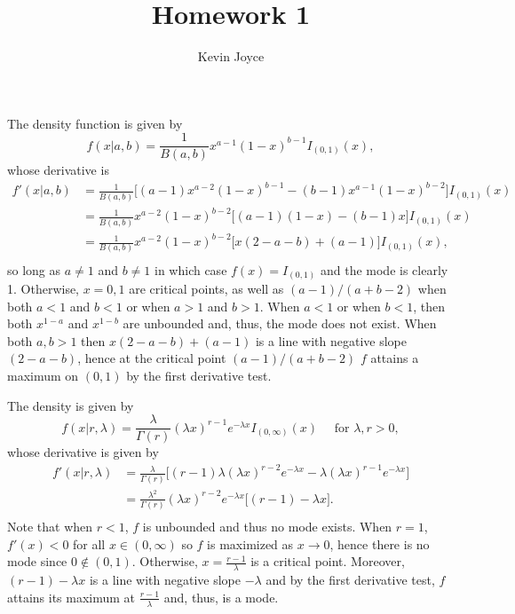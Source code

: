 \documentclass{homework}
\title{Homework 1}
\author{Kevin Joyce}
\begin{document}

  \begin{solution}
  The density function is given by 
  $$
    f(x|a,b) = \frac{1}{B(a,b)} x^{a-1}(1-x)^{b-1}I_{(0,1)}(x),
  $$
  whose derivative is 
  \begin{align*}
    f'(x|a,b) &= \frac{1}{B(a,b)} \Big[ (a-1)x^{a-2}(1-x)^{b-1} - (b-1)x^{a-1}(1-x)^{b-2}\Big]I_{(0,1)}(x) \\
	      &= \frac{1}{B(a,b)} x^{a-2}(1-x)^{b-2} \big[ (a-1)(1-x) - (b-1)x \big]I_{(0,1)}(x) \\
	      &= \frac{1}{B(a,b)} x^{a-2}(1-x)^{b-2} \big[ x(2-a-b) + (a-1)  \big]I_{(0,1)}(x), \\
  \end{align*}
  so long as $a\not=1$ and $b\not=1$ in which case $f(x) = I_{(0,1)}$ and the mode is clearly 1.  Otherwise, $x=0, 1$ are critical points, as well as $(a-1)/(a+b-2)$ when both $a<1$ and $b<1$ or when $a>1$ and $b>1$.  When $a<1$ or when $b<1$, then both $x^{1-a}$ and $x^{1-b}$ are unbounded and, thus, the mode does not exist.  When both $a,b>1$ then $x(2-a-b) + (a-1)$ is a line with negative slope $(2-a-b)$, hence at the critical point $(a-1)/(a+b-2)$ $f$ attains a maximum on $(0,1)$ by the first derivative test.
  \end{solution}

  \begin{solution}
  The density is given by
  $$
    f(x|r,\lambda) = \frac{\lambda}{\Gamma(r)} (\lambda x)^{r-1}e^{-\lambda x}I_{(0,\infty)}(x) \quad \text{ for } \lambda,r>0,
  $$
  whose derivative is given by
  \begin{align*}
    f'(x|r,\lambda) &= \frac{\lambda}{\Gamma(r)}\Big[ (r-1)\lambda(\lambda x)^{r-2}e^{-\lambda x} - \lambda (\lambda x)^{r-1}e^{-\lambda x} \Big] \\
      &= \frac{\lambda^2}{\Gamma(r)} (\lambda x)^{r-2} e^{-\lambda x}\Big[ (r-1) - \lambda x\Big]. \\
\end{align*}
  Note that when $r < 1$, $f$ is unbounded and thus no mode exists. When $ r = 1 $, $f'(x) < 0$ for all $x \in (0,\infty)$ so $f$ is maximized as $x\to0$, hence there is no mode since $0\notin(0,1)$.  Otherwise, $x = \frac{r-1}{\lambda}$ is a critical point. Moreover, $(r-1) - \lambda x$ is a line with negative slope $-\lambda$ and by the first derivative test, $f$ attains its maximum at $\frac{r-1}{\lambda}$ and, thus, is a mode.  
  \end{solution}
\end{document}
